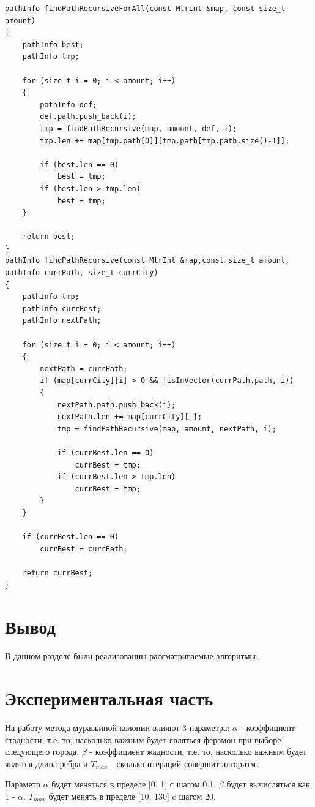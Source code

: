 \documentclass[12pt]{report}
\begin{document}
	\begin{lstlisting}[label=some-code,caption=Алгоритм полного перебора]
pathInfo findPathRecursiveForAll(const MtrInt &map, const size_t amount)
{
	pathInfo best;
	pathInfo tmp;
	
	for (size_t i = 0; i < amount; i++)
	{
		pathInfo def;
		def.path.push_back(i);
		tmp = findPathRecursive(map, amount, def, i);
		tmp.len += map[tmp.path[0]][tmp.path[tmp.path.size()-1]];
		
		if (best.len == 0)
			best = tmp;
		if (best.len > tmp.len)
			best = tmp;
	}
	
	return best;
}
pathInfo findPathRecursive(const MtrInt &map,const size_t amount, pathInfo currPath, size_t currCity)
{
	pathInfo tmp;
	pathInfo currBest;
	pathInfo nextPath;
	
	for (size_t i = 0; i < amount; i++)
	{
		nextPath = currPath;
		if (map[currCity][i] > 0 && !isInVector(currPath.path, i))
		{
			nextPath.path.push_back(i);
			nextPath.len += map[currCity][i];
			tmp = findPathRecursive(map, amount, nextPath, i);
			
			if (currBest.len == 0)
				currBest = tmp;
			if (currBest.len > tmp.len)
				currBest = tmp;
		}
	}
	
	if (currBest.len == 0)
		currBest = currPath;
	
	return currBest;
}
	\end{lstlisting}
	
	\chapter*{Вывод}
	
	В данном разделе были реализованны рассматриваемые алгоритмы.
	
	\chapter{Экспериментальная часть}
	
	На работу метода муравьиной колонии влияют 3 параметра: $\alpha$ - коэффициент стадности, т.е. то, насколько важным будет являться ферамон при выборе следующего города, $\beta$ - коэффициент жадности, т.е. то, насколько важным будет являтся длина ребра и $T_{max}$ - сколько итераций совершит алгоритм.
	
	\begin{center}
		Параметр $\alpha$ будет меняться в пределе [0, 1] с шагом 0.1. $\beta$ будет вычисляться как 1 - $\alpha$.
		$T_{max}$ будет менять в пределе [10, 130] c шагом 20.
	\end{center}
	
\end{document}
